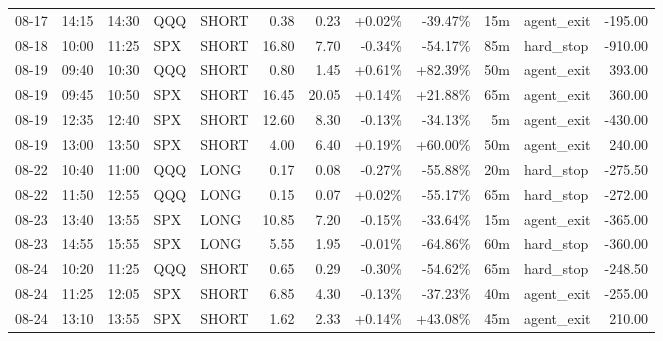 \documentclass[11pt,a4paper,twoside]{article}
\begin{document}
\begin{center}
\begin{longtable}{>{\color{txtmain}}l l l l l r r r r r >{\color{txtmain}}l r}
08-17 & 14:15 & 14:30 & QQQ & SHORT & 0.38 & 0.23 & \textcolor{wingreen}{+0.02\%} & \textcolor{lossred}{-39.47\%} & 15m & agent\_exit & \textcolor{lossred}{-195.00} \\
08-18 & 10:00 & 11:25 & SPX & SHORT & 16.80 & 7.70 & \textcolor{lossred}{-0.34\%} & \textcolor{lossred}{-54.17\%} & 85m & hard\_stop & \textcolor{lossred}{-910.00} \\
08-19 & 09:40 & 10:30 & QQQ & SHORT & 0.80 & 1.45 & \textcolor{wingreen}{+0.61\%} & \textcolor{wingreen}{+82.39\%} & 50m & agent\_exit & \textcolor{wingreen}{393.00} \\
08-19 & 09:45 & 10:50 & SPX & SHORT & 16.45 & 20.05 & \textcolor{wingreen}{+0.14\%} & \textcolor{wingreen}{+21.88\%} & 65m & agent\_exit & \textcolor{wingreen}{360.00} \\
08-19 & 12:35 & 12:40 & SPX & SHORT & 12.60 & 8.30 & \textcolor{lossred}{-0.13\%} & \textcolor{lossred}{-34.13\%} & 5m & agent\_exit & \textcolor{lossred}{-430.00} \\
08-19 & 13:00 & 13:50 & SPX & SHORT & 4.00 & 6.40 & \textcolor{wingreen}{+0.19\%} & \textcolor{wingreen}{+60.00\%} & 50m & agent\_exit & \textcolor{wingreen}{240.00} \\
08-22 & 10:40 & 11:00 & QQQ & LONG & 0.17 & 0.08 & \textcolor{lossred}{-0.27\%} & \textcolor{lossred}{-55.88\%} & 20m & hard\_stop & \textcolor{lossred}{-275.50} \\
08-22 & 11:50 & 12:55 & QQQ & LONG & 0.15 & 0.07 & \textcolor{wingreen}{+0.02\%} & \textcolor{lossred}{-55.17\%} & 65m & hard\_stop & \textcolor{lossred}{-272.00} \\
08-23 & 13:40 & 13:55 & SPX & LONG & 10.85 & 7.20 & \textcolor{lossred}{-0.15\%} & \textcolor{lossred}{-33.64\%} & 15m & agent\_exit & \textcolor{lossred}{-365.00} \\
08-23 & 14:55 & 15:55 & SPX & LONG & 5.55 & 1.95 & \textcolor{lossred}{-0.01\%} & \textcolor{lossred}{-64.86\%} & 60m & hard\_stop & \textcolor{lossred}{-360.00} \\
08-24 & 10:20 & 11:25 & QQQ & SHORT & 0.65 & 0.29 & \textcolor{lossred}{-0.30\%} & \textcolor{lossred}{-54.62\%} & 65m & hard\_stop & \textcolor{lossred}{-248.50} \\
08-24 & 11:25 & 12:05 & SPX & SHORT & 6.85 & 4.30 & \textcolor{lossred}{-0.13\%} & \textcolor{lossred}{-37.23\%} & 40m & agent\_exit & \textcolor{lossred}{-255.00} \\
08-24 & 13:10 & 13:55 & SPX & SHORT & 1.62 & 2.33 & \textcolor{wingreen}{+0.14\%} & \textcolor{wingreen}{+43.08\%} & 45m & agent\_exit & \textcolor{wingreen}{210.00} \\

\end{longtable}
\end{center}
\end{document}

